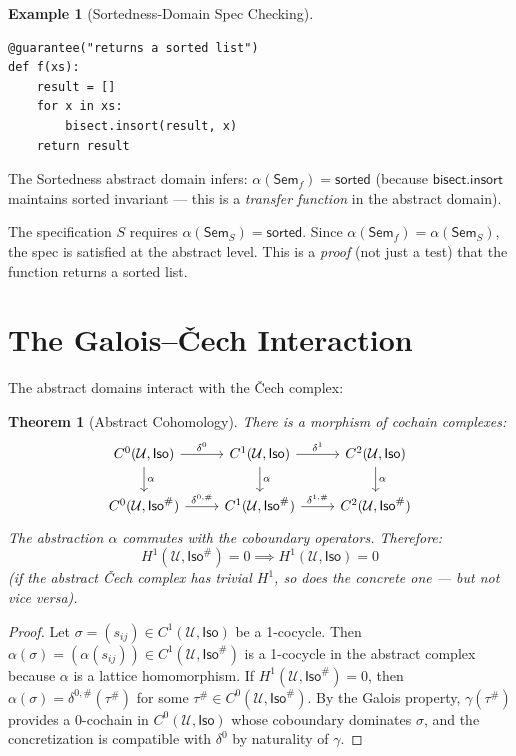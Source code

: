 \documentclass[11pt,a4paper]{report}
\theoremstyle{definition}
\newtheorem{example}[definition]{Example}
\theoremstyle{plain}
\newtheorem{theorem}[definition]{Theorem}
\newcommand{\covers}{\mathcal{U}}
\newcommand{\Sem}{\mathsf{Sem}}
\newcommand{\Iso}{\mathsf{Iso}}
\newcommand{\Hone}{H^1}
\begin{document}
\begin{example}[Sortedness-Domain Spec Checking]
\begin{lstlisting}
@guarantee("returns a sorted list")
def f(xs):
    result = []
    for x in xs:
        bisect.insort(result, x)
    return result
\end{lstlisting}

The Sortedness abstract domain infers:
$\alpha(\Sem_f) = \mathsf{sorted}$ (because $\mathsf{bisect.insort}$
maintains sorted invariant --- this is a \emph{transfer function}
in the abstract domain).

The specification $S$ requires $\alpha(\Sem_S) = \mathsf{sorted}$.
Since $\alpha(\Sem_f) = \alpha(\Sem_S)$, the spec is satisfied at
the abstract level.  This is a \emph{proof} (not just a test) that
the function returns a sorted list.
\end{example}

\section{The Galois--\v{C}ech Interaction}

The abstract domains interact with the \v{C}ech complex:

\begin{theorem}[Abstract Cohomology]
\label{thm:abstract-cohomology}
There is a morphism of cochain complexes:
\[
\begin{tikzcd}
  C^0(\covers, \Iso) \arrow[r, "\delta^0"] \arrow[d, "\alpha"] &
  C^1(\covers, \Iso) \arrow[r, "\delta^1"] \arrow[d, "\alpha"] &
  C^2(\covers, \Iso) \arrow[d, "\alpha"] \\
  C^0(\covers, \Iso^\#) \arrow[r, "\delta^{0,\#}"] &
  C^1(\covers, \Iso^\#) \arrow[r, "\delta^{1,\#}"] &
  C^2(\covers, \Iso^\#)
\end{tikzcd}
\]
The abstraction $\alpha$ commutes with the coboundary operators.
Therefore:
\[
  \Hone(\covers, \Iso^\#) = 0 \implies \Hone(\covers, \Iso) = 0
\]
(if the abstract \v{C}ech complex has trivial $\Hone$, so does the
concrete one --- but not vice versa).
\end{theorem}

\begin{proof}
Let $\sigma = (s_{ij}) \in C^1(\covers, \Iso)$ be a 1-cocycle.
Then $\alpha(\sigma) = (\alpha(s_{ij})) \in C^1(\covers, \Iso^\#)$
is a 1-cocycle in the abstract complex because $\alpha$ is a lattice
homomorphism.  If $\Hone(\covers, \Iso^\#) = 0$, then $\alpha(\sigma)
= \delta^{0,\#}(\tau^\#)$ for some $\tau^\# \in C^0(\covers, \Iso^\#)$.
By the Galois property, $\gamma(\tau^\#)$ provides a 0-cochain in
$C^0(\covers, \Iso)$ whose coboundary dominates $\sigma$, and the
concretization is compatible with $\delta^0$ by naturality of $\gamma$.
\end{proof}
\end{document}
